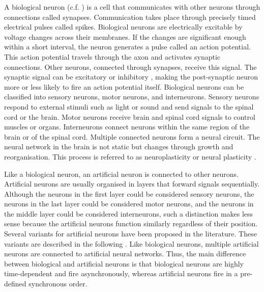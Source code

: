 A biological neuron (c.f. ) is a cell that communicates with other neurons through connections called synapses.
Communication takes place through precisely timed electrical pulses called spikes.
Biological neurons are electrically excitable by voltage changes across their membranes.
If the changes are significant enough within a short interval, the neuron generates a pulse called an action potential.
This action potential travels through the axon and activates synaptic connections.
Other neurons, connected through synapses, receive this signal.
The synaptic signal can be excitatory  or inhibitory , making the post-synaptic neuron more or less likely to fire an action potential itself.
Biological neurons can be classified into sensory neurons, motor neurons, and interneurons.
Sensory neurons respond to external stimuli such as light or sound and send signals to the spinal cord or the brain.
Motor neurons receive brain and spinal cord signals to control muscles or organs.
Interneurons connect neurons within the same region of the brain or of the spinal cord.
Multiple connected neurons form a neural circuit.
The neural network in the brain is not static but changes through growth and reorganisation.
This process is referred to as neuroplasticity or neural plasticity .

Like a biological neuron, an artificial neuron is connected to other neurons.
Artificial neurons are usually organised in layers that forward signals sequentially.
Although the neurons in the first layer could be considered sensory neurons, the neurons in the last layer could be considered motor neurons, and the neurons in the middle layer could be considered interneurons, such a distinction makes less sense because the artificial neurons function similarly regardless of their position.
Several variants for artificial neurons have been proposed in the literature. These variants are described in the following  .
Like biological neurons, multiple artificial neurons are connected to artificial neural networks.
Thus, the main difference between biological and artificial neurons is that biological neurons are highly time-dependent and fire asynchronously, whereas artificial neurons fire in a pre-defined synchronous order.

